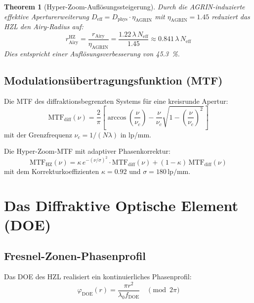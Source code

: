 ﻿\documentclass[12pt,a4paper]{article}
\newtheorem{theorem}{Theorem}[section]
\theoremstyle{definition}
\newcommand{\HZ}{\mathrm{HZ}}
\newcommand{\eff}{\mathrm{eff}}
\newcommand{\AGRIN}{\mathrm{AGRIN}}
\newcommand{\DOE}{\mathrm{DOE}}
\newcommand{\MTF}{\mathrm{MTF}}
\begin{document}
	\begin{theorem}[Hyper-Zoom-Auflösungssteigerung]
		Durch die AGRIN-induzierte effektive Aperturerweiterung
		$D_\eff = D_\mathrm{phys}\cdot\eta_\AGRIN$ mit $\eta_\AGRIN = 1.45$
		reduziert das HZL den Airy-Radius auf:
		\begin{equation}
			r_\mathrm{Airy}^\HZ = \frac{r_\mathrm{Airy}}{\eta_\AGRIN}
			= \frac{1.22\,\lambda\,N_\eff}{1.45}
			\approx 0.841\,\lambda\,N_\eff
			\label{eq:hz_resolution}
		\end{equation}
		Dies entspricht einer Auflösungsverbesserung von \SI{45.3}{\percent}.
	\end{theorem}
	
	\subsection{Modulationsübertragungsfunktion (MTF)}
	
	Die MTF des diffraktionsbegrenzten Systems für eine kreisrunde Apertur:
	\begin{equation}
		\MTF_\mathrm{diff}(\nu) = \frac{2}{\pi}
		\left[\arccos\!\left(\frac{\nu}{\nu_c}\right)
		- \frac{\nu}{\nu_c}\sqrt{1-\left(\frac{\nu}{\nu_c}\right)^{\!2\,}}\right]
		\label{eq:mtf_diff}
	\end{equation}
	mit der Grenzfrequenz $\nu_c = 1/(N\lambda)$ in lp/mm.
	
	Die Hyper-Zoom-MTF mit adaptiver Phasenkorrektur:
	\begin{equation}
		\MTF_\HZ(\nu) = \kappa\,e^{-(\nu/\sigma)^2}\cdot\MTF_\mathrm{diff}(\nu)
		+ (1-\kappa)\,\MTF_\mathrm{diff}(\nu)
		\label{eq:mtf_hz}
	\end{equation}
	mit dem Korrekturkoeffizienten $\kappa = 0.92$ und
	$\sigma = 180\,\mathrm{lp/mm}$.
	
	\section{Das Diffraktive Optische Element (DOE)}
	
	\subsection{Fresnel-Zonen-Phasenprofil}
	
	Das DOE des HZL realisiert ein kontinuierliches Phasenprofil:
	\begin{equation}
		\varphi_\DOE(r) = \frac{\pi r^2}{\lambda_0 f_\DOE}
		\quad\pmod{2\pi}
		\label{eq:doe_phase}
	\end{equation}
	
\end{document}
